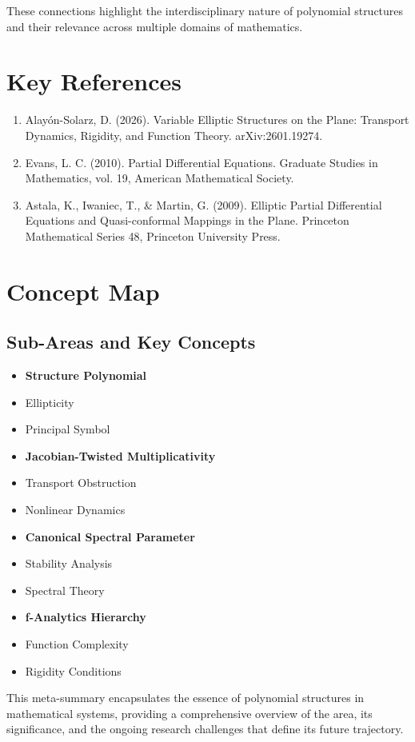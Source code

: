 \documentclass[11pt,a4paper]{article}
\begin{document}
These connections highlight the interdisciplinary nature of polynomial structures and their relevance across multiple domains of mathematics.

\section{Key References}

\begin{enumerate}
\item Alayón-Solarz, D. (2026). Variable Elliptic Structures on the Plane: Transport Dynamics, Rigidity, and Function Theory. arXiv:2601.19274.
\item Evans, L. C. (2010). Partial Differential Equations. Graduate Studies in Mathematics, vol. 19, American Mathematical Society.
\item Astala, K., Iwaniec, T., & Martin, G. (2009). Elliptic Partial Differential Equations and Quasi-conformal Mappings in the Plane. Princeton Mathematical Series 48, Princeton University Press.
\end{enumerate}

\section{Concept Map}

\subsection{Sub-Areas and Key Concepts}

\begin{itemize}
\item \textbf{Structure Polynomial}
\item Ellipticity
\item Principal Symbol
\item \textbf{Jacobian-Twisted Multiplicativity}
\item Transport Obstruction
\item Nonlinear Dynamics
\item \textbf{Canonical Spectral Parameter}
\item Stability Analysis
\item Spectral Theory
\item \textbf{f-Analytics Hierarchy}
\item Function Complexity
\item Rigidity Conditions
\end{itemize}

This meta-summary encapsulates the essence of polynomial structures in mathematical systems, providing a comprehensive overview of the area, its significance, and the ongoing research challenges that define its future trajectory.
\end{document}

